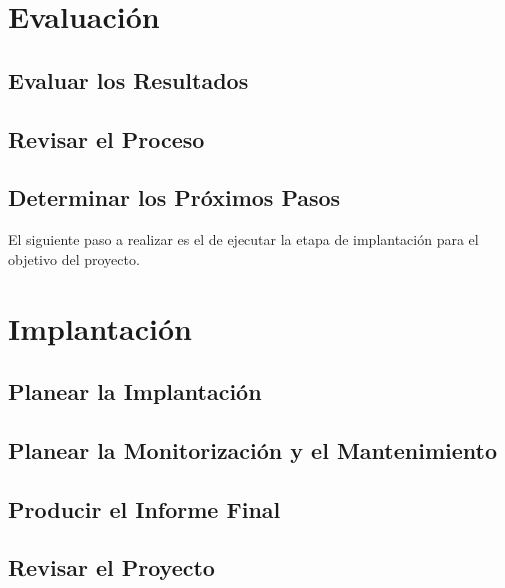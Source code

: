 \documentclass{article}
\begin{document}
\section{Evaluación}
\subsection{Evaluar los Resultados}
\subsection{Revisar el Proceso}
\subsection{Determinar los Próximos Pasos}
El siguiente paso a realizar es el de ejecutar la etapa de implantación para el objetivo del proyecto.

\section{Implantación}
\subsection{Planear la Implantación}
\subsection{Planear la Monitorización y el Mantenimiento}
\subsection{Producir el Informe Final}
\subsection{Revisar el Proyecto}
\end{document}
